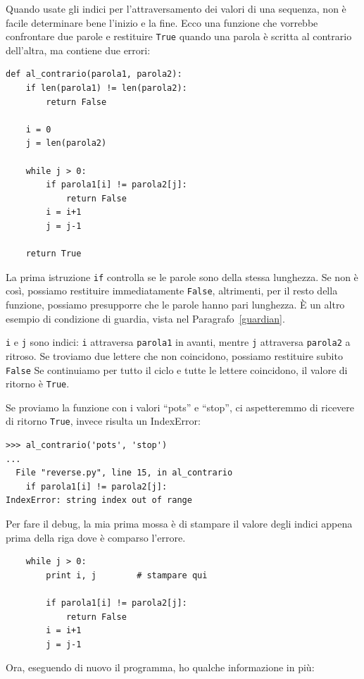 \documentclass[10pt]{book}
\begin{document}
Quando usate gli indici per l'attraversamento dei valori di una sequenza, non è facile determinare bene l'inizio e la fine. Ecco una funzione che vorrebbe confrontare due parole e restituire {\tt True} quando una parola è scritta al contrario dell'altra, ma contiene due errori:

\begin{verbatim}
def al_contrario(parola1, parola2):
    if len(parola1) != len(parola2):
        return False
    
    i = 0
    j = len(parola2)

    while j > 0:
        if parola1[i] != parola2[j]:
            return False
        i = i+1
        j = j-1

    return True
\end{verbatim}
%
La prima istruzione {\tt if} controlla se le parole sono della stessa lunghezza. Se non è così, possiamo restituire immediatamente {\tt False}, altrimenti, per il resto della funzione, possiamo presupporre che le parole hanno pari lunghezza. È un altro esempio di condizione di guardia, vista nel Paragrafo~\ref{guardian}.

{\tt i} e {\tt j} sono indici: {\tt i} attraversa {\tt parola1}
in avanti, mentre {\tt j} attraversa {\tt parola2} a ritroso. Se troviamo due lettere che non coincidono, possiamo restituire subito {\tt False} Se continuiamo per tutto il ciclo e tutte le lettere coincidono, il valore di ritorno è {\tt True}.

Se proviamo la funzione con i valori ``pots'' e ``stop'', ci aspetteremmo di ricevere di ritorno {\tt True}, invece risulta un IndexError:

\begin{verbatim}
>>> al_contrario('pots', 'stop')
...
  File "reverse.py", line 15, in al_contrario
    if parola1[i] != parola2[j]:
IndexError: string index out of range
\end{verbatim}
%
Per fare il debug, la mia prima mossa è di stampare il valore degli indici appena prima della riga dove è comparso l'errore.

\begin{verbatim}
    while j > 0:
        print i, j        # stampare qui
        
        if parola1[i] != parola2[j]:
            return False
        i = i+1
        j = j-1
\end{verbatim}
%
Ora, eseguendo di nuovo il programma, ho qualche informazione in più:
\end{document}
